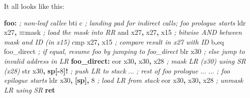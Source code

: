 \documentclass[a4paper, nobind]{templates/ociamthesis}
\newenvironment{Shaded}{\begin{snugshade}}{\end{snugshade}}
\newcommand{\BuiltInTok}[1]{#1}
\newcommand{\CommentTok}[1]{\textcolor[rgb]{0.56,0.35,0.01}{\textit{#1}}}
\newcommand{\ControlFlowTok}[1]{\textcolor[rgb]{0.13,0.29,0.53}{\textbf{#1}}}
\newcommand{\DecValTok}[1]{\textcolor[rgb]{0.00,0.00,0.81}{#1}}
\newcommand{\FunctionTok}[1]{\textcolor[rgb]{0.13,0.29,0.53}{\textbf{#1}}}
\newcommand{\KeywordTok}[1]{\textcolor[rgb]{0.13,0.29,0.53}{\textbf{#1}}}
\newcommand{\NormalTok}[1]{#1}
\newcommand{\OperatorTok}[1]{\textcolor[rgb]{0.81,0.36,0.00}{\textbf{#1}}}
\renewenvironment{Shaded}
{
  \vspace{10pt}%
  \begin{snugshade}%
}{%
  \end{snugshade}%
  \vspace{8pt}%
}
\begin{document}
It all looks like this:

\begin{Shaded}
\begin{Highlighting}[]
\FunctionTok{foo:}                    \CommentTok{; non{-}leaf callee}
\NormalTok{  bti c                 }\CommentTok{; landing pad for indirect calls; foo prologue starts}
\NormalTok{  ldr x27}\OperatorTok{,} \OperatorTok{=}\NormalTok{mask        }\CommentTok{; load the mask into RR}
  \BuiltInTok{and}\NormalTok{ x27}\OperatorTok{,}\NormalTok{ x27}\OperatorTok{,}\NormalTok{ x15     }\CommentTok{; bitwise AND between mask and ID (in x15)}
  \BuiltInTok{cmp}\NormalTok{ x27}\OperatorTok{,}\NormalTok{ x15          }\CommentTok{; compare result in x27 with ID}
\NormalTok{  b}\OperatorTok{.}\NormalTok{eq foo\_direct       }\CommentTok{; if equal, resume foo by jumping to foo\_direct}
\NormalTok{  blr x30               }\CommentTok{; else jump to invalid address in LR}
\FunctionTok{foo\_direct:}
\NormalTok{  eor x30}\OperatorTok{,}\NormalTok{ x30}\OperatorTok{,}\NormalTok{ x28     }\CommentTok{; mask LR (x30) using SR (x28)}
  \BuiltInTok{str}\NormalTok{ x30}\OperatorTok{,} \KeywordTok{sp}\OperatorTok{[{-}}\DecValTok{8}\OperatorTok{]!}      \CommentTok{; push LR to stack}
\NormalTok{  ...                   }\CommentTok{; rest of foo prologue}
\NormalTok{  ...}
\NormalTok{  ...                   }\CommentTok{; foo epilogue starts}
\NormalTok{  ldr x30}\OperatorTok{,} \OperatorTok{[}\KeywordTok{sp}\OperatorTok{],} \DecValTok{8}      \CommentTok{; load LR from stack}
\NormalTok{  eor x30}\OperatorTok{,}\NormalTok{ x30}\OperatorTok{,}\NormalTok{ x28     }\CommentTok{; unmask LR using SR}
  \ControlFlowTok{ret}


\end{Highlighting}
\end{Shaded}
\end{document}
